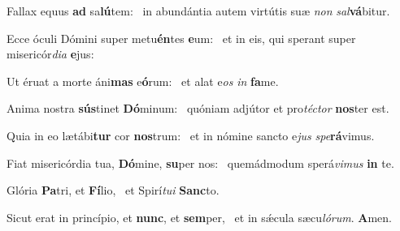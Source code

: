 \item Fallax equus \textbf{ad} sa\textbf{lú}tem:~\psstar{} in abundántia autem virtútis suæ \textit{non} \textit{sal}\textbf{vá}bitur.
\item Ecce óculi Dómini super metu\textbf{én}tes \textbf{e}um:~\psstar{} et in eis, qui sperant super misericór\textit{dia} \textbf{e}jus:
\item Ut éruat a morte áni\textbf{mas} e\textbf{ó}rum:~\psstar{} et alat e\textit{os} \textit{in} \textbf{fa}me.
\item Anima nostra \textbf{sús}tinet \textbf{Dó}minum:~\psstar{} quóniam adjútor et pro\textit{téctor} \textbf{nos}ter est.
\item Quia in eo lætábi\textbf{tur} cor \textbf{nos}trum:~\psstar{} et in nómine sancto e\textit{jus} \textit{spe}\textbf{rá}vimus.
\item Fiat misericórdia tua, \textbf{Dó}mine, \textbf{su}per nos:~\psstar{} quemádmodum sperá\textit{vimus} \textbf{in} te.
\item Glória \textbf{Pa}tri, et \textbf{Fí}lio,~\psstar{} et Spirí\textit{tui} \textbf{Sanc}to.
\item Sicut erat in princípio, et \textbf{nunc}, et \textbf{sem}per,~\psstar{} et in sǽcula sæcu\textit{lórum}. \textbf{A}men.